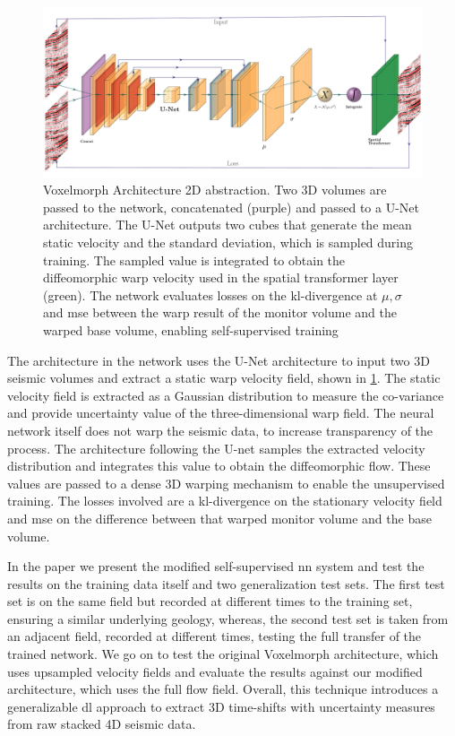 \begin{figure}
    \centering
    \includegraphics[width=\textwidth]{figures/Voxelmorph.pdf}
    \caption{Voxelmorph Architecture 2D abstraction. Two 3D volumes are passed to the network, concatenated (purple) and passed to a U-Net architecture. The U-Net outputs two cubes that generate the mean static velocity and the standard deviation, which is sampled during training. The sampled value is integrated to obtain the diffeomorphic warp velocity used in the spatial transformer layer (green). The network evaluates losses on the \ac{kl}-divergence at $\mu, \sigma$ and \ac{mse} between the warp result of the monitor volume and the warped base volume, enabling self-supervised training \citep[from][]{dramsch20193dwarping}}
    \label{fig:voxelmorph}
\end{figure}

The architecture in the network uses the U-Net architecture to input two 3D seismic volumes and extract a static warp velocity field, shown in \cref{fig:voxelmorph}. The static velocity field is extracted as a Gaussian distribution to measure the co-variance and provide uncertainty value of the three-dimensional warp field. The neural network itself does not warp the seismic data, to increase transparency of the process. The architecture following the U-net samples the extracted velocity distribution and integrates this value to obtain the diffeomorphic flow. These values are passed to a dense 3D warping mechanism to enable the unsupervised training. The losses involved are a \acf{kl}-divergence on the stationary velocity field and \ac{mse} on the difference between that warped monitor volume and the base volume.

In the paper we present the modified self-supervised \acl{nn} system and test the results on the training data itself and two generalization test sets. The first test set is on the same field but recorded at different times to the training set, ensuring a similar underlying geology, whereas, the second test set is taken from an adjacent field, recorded at different times, testing the full transfer of the trained network. We go on to test the original Voxelmorph architecture, which uses upsampled velocity fields and evaluate the results against our modified architecture, which uses the full flow field. Overall, this technique introduces a generalizable \acl{dl} approach to extract 3D time-shifts with uncertainty measures from raw stacked 4D seismic data.